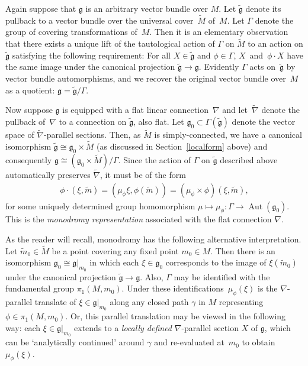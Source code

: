 \documentclass[pdftex]{sigma}
\DeclareMathOperator{\automorphism}{Aut}
\numberwithin{equation}{section}
\begin{document}
Again suppose that $\mathfrak g$ is an arbitrary vector bundle over
$M$. Let $\tilde {\mathfrak g} $ denote its pullback to a vector
bundle over the universal cover~$\tilde M$ of~$M$. Let $\Gamma$ denote
the group of covering transformations of~$M$. Then it is an elementary
observation that there exists a unique lift of the tautological action
of $\Gamma$ on $\tilde M$ to an action on $\tilde {\mathfrak g} $
satisfying the following requirement: For all $X\in \tilde {\mathfrak
  g} $ and $\phi \in \Gamma$, $X$~and~$\phi \cdot X $ have the same
image under the canonical projection $\tilde {\mathfrak g} \rightarrow
{\mathfrak g}$. Evidently $\Gamma$ acts on~$\tilde {\mathfrak g} $ by
vector bundle automorphisms, and we recover the original vector bundle
over~$M$ as a quotient: ${\mathfrak g}=\tilde {\mathfrak g}/\Gamma $.

Now suppose $\mathfrak g$ is equipped with a f\/lat linear connection~$\nabla$ and let~$\tilde \nabla $ denote the pullback of~$\nabla $ to
a connection on $\tilde {\mathfrak g} $, also f\/lat. Let ${\mathfrak
  g}_0 \subset \Gamma(\tilde {\mathfrak g})$ denote the vector space
of $\tilde \nabla $-parallel sections. Then, as $\tilde M$ is
simply-connected, we have a canonical isomorphism $\tilde {\mathfrak
  g} \cong {\mathfrak g}_0 \times \tilde M$ (as discussed in
Section~\ref{localform} above) and consequently ${\mathfrak g} \cong
({\mathfrak g}_0 \times \tilde M)/\Gamma$.  Since the action of
$\Gamma $ on $\tilde {\mathfrak g} $ described above automatically
preserves $\tilde \nabla $, it must be of the form
\begin{gather}
  \phi \cdot (\xi, \tilde m)=(\mu_\phi \xi,\phi(\tilde m))=(\mu_\phi \times \phi)(\xi,\tilde m),\label{form}
\end{gather}
for some uniquely determined group homomorphism $\mu \mapsto \mu_\phi
\colon \Gamma \rightarrow \automorphism({\mathfrak g}_0)$. This is the
{\it mo\-nodromy representation} associated with the f\/lat connection $\nabla$.

\begin{RemarkBlaom}\label{Remark2.6}
  As the reader will recall, monodromy has the following alternative
  interpretation. Let $\tilde m_0 \in \tilde M$ be a point covering
  any f\/ixed point $m_0 \in M$. Then there is an isomorphism
  ${\mathfrak g}_0 \cong {\mathfrak g}|_{m_0}$ in which each $\xi \in
  {\mathfrak g}_0 $ corresponds to the image of $\xi(\tilde m_0)$
  under the canonical projection $\tilde {\mathfrak g} \rightarrow
  {\mathfrak g}$. Also, $\Gamma$ may be identif\/ied with the
  fundamental group $\pi_1(M,m_0)$. Under these identif\/ications~$\mu_\phi (\xi )$ is the $\nabla$-parallel translate of $\xi \in
  {\mathfrak g}|_{m_0}$ along any closed path $\gamma $ in $M$
  representing $\phi \in \pi_1(M, m_0)$. Or, this parallel translation
  may be viewed in the following way: each $\xi \in {\mathfrak
    g}|_{m_0}$ extends to a {\em locally defined} $\nabla$-parallel
  section $X$ of $\mathfrak g$, which can be `analytically
  continued' around $\gamma $ and re-evaluated at~$m_0$ to obtain
  $\mu_\phi (\xi)$.
\end{RemarkBlaom}
\end{document}

